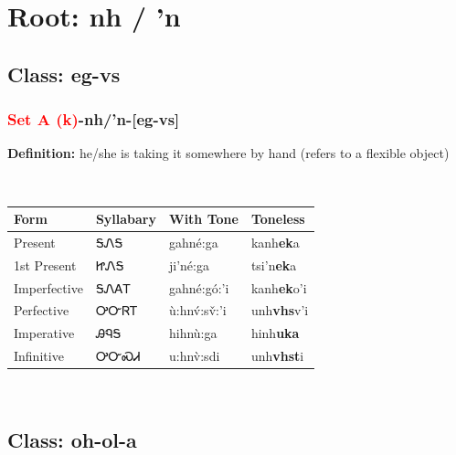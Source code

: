 \needspace{4in}
\section*{Root: nh / 'n}
\nopagebreak
{}
\needspace{3in}
\subsection*{Class: eg-vs}
\nopagebreak
\needspace{2in}
\subsubsection*{\textcolor{Red}{Set A (k)}{-}\textbf{nh/'n}{-}[eg-vs]}
\nopagebreak
\textbf{Definition: } he/she is taking it somewhere by hand (refers to a flexible object)
\\[0.5em]
\begin{tabularx}{\textwidth}{l X X X}%
\toprule%
\textbf{Form}&\textbf{Syllabary}&\textbf{With Tone}&\textbf{Toneless}\\%
\midrule%
Present&ᎦᏁᎦ&gahné:ga&kanh\textbf{ek}a\\%
1st Present&ᏥᏁᎦ&ji’né:ga&tsi'n\textbf{ek}a\\%
Imperfective&ᎦᏁᎪᎢ&gahné:gó:’i&kanh\textbf{ek}o'i\\%
Perfective&ᎤᏅᏒᎢ&ù:hnv́:sv̌:’i&unh\textbf{vhs}v'i\\%
Imperative&ᎯᏄᎦ&hihnù:ga&hinh\textbf{uka}\\%
Infinitive&ᎤᏅᏍᏗ&u:hnv̀:sdi&unh\textbf{vhst}i\\%
\bottomrule%
\end{tabularx}
\\[1em]
\needspace{3in}
\subsection*{Class: oh-ol-a}
\nopagebreak
\needspace{2in}
